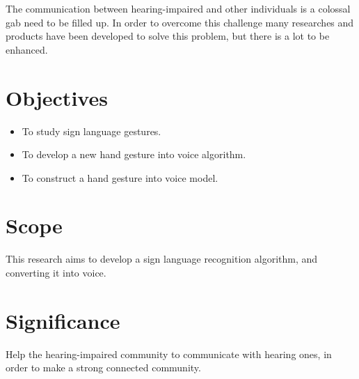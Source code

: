 \documentclass[12pt]{report}
\begin{document}
                The communication between hearing-impaired and other individuals is a colossal gab 
                need to be filled up. In order to overcome this challenge 
                many researches and products have been developed to solve this problem, 
                but there is a lot to be enhanced.
        
        \section{Objectives}
            \begin{itemize}
                \item To study sign language gestures.
                \item To develop a new hand gesture into voice algorithm.
                \item To construct a hand gesture into voice model.
            \end{itemize}
        
        \section{Scope}
                This research aims to develop a sign language recognition algorithm,
                and converting it into voice.
        \section{Significance}
                Help the hearing-impaired community to communicate with hearing ones, 
                in order to make a strong connected community.
\end{document}
